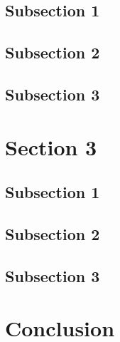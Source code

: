 \documentclass[12pt, a4paper]{article}
\begin{document}
\subsection{Subsection 1}

\lipsum[1-2]

\subsection{Subsection 2}

\lipsum[1-2]

\subsection{Subsection 3}

\lipsum[1-2]

\pagebreak

\section{Section 3}

\subsection{Subsection 1}

\lipsum[1-2]

\subsection{Subsection 2}

\lipsum[1-2]

\subsection{Subsection 3}

\lipsum[1-2]

\pagebreak

\section{Conclusion}

\lipsum[1-2]

\pagebreak

\end{document}
